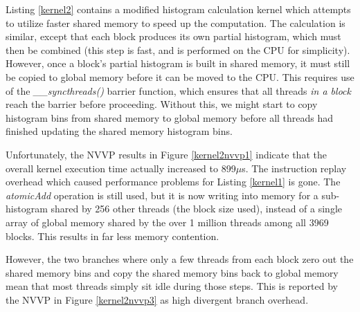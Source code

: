 \documentclass{article}
\begin{document}
Listing \ref{kernel2} contains a modified histogram calculation kernel which attempts to utilize faster shared memory to speed up the computation. The calculation is similar, except that each block produces its own partial histogram, which must then be combined (this step is fast, and is performed on the CPU for simplicity). However, once a block's partial histogram is built in shared memory, it must still be copied to global memory before it can be moved to the CPU. This requires use of the \emph{\_\_syncthreads()} barrier function, which ensures that all threads \emph{in a block} reach the barrier before proceeding. Without this, we might start to copy histogram bins from shared memory to global memory before all threads had finished updating the shared memory histogram bins.

Unfortunately, the NVVP results in Figure \ref{kernel2nvvp1} indicate that the overall kernel execution time actually increased to 899$\mu$s. The instruction replay overhead which caused performance problems for Listing \ref{kernel1} is gone. The \emph{atomicAdd} operation is still used, but it is now writing into memory for a sub-histogram shared by 256 other threads (the block size used), instead of a single array of global memory shared by the over 1 million threads among all 3969 blocks. This results in far less memory contention.

However, the two branches where only a few threads from each block zero out the shared memory bins and copy the shared memory bins back to global memory mean that most threads simply sit idle during those steps. This is reported by the NVVP in Figure \ref{kernel2nvvp3} as high divergent branch overhead.
\end{document}
